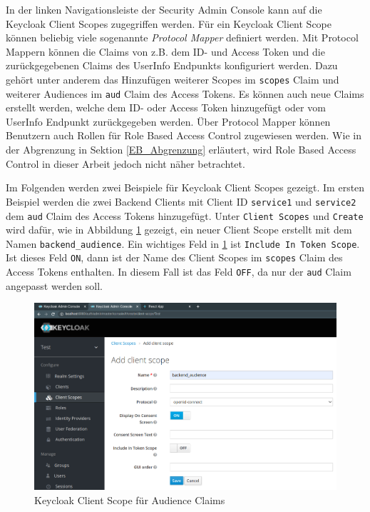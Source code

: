 In der linken Navigationsleiste der Security Admin Console kann auf die Keycloak Client Scopes zugegriffen werden. Für ein Keycloak Client Scope können beliebig viele sogenannte \textit{Protocol Mapper} definiert werden. Mit Protocol Mappern können die Claims von z.B. dem ID- und Access Token und die zurückgegebenen Claims des UserInfo Endpunkts konfiguriert werden. Dazu gehört unter anderem das Hinzufügen weiterer Scopes im \texttt{scopes} Claim und weiterer Audiences im \texttt{aud} Claim des Access Tokens. Es können auch neue Claims erstellt werden, welche dem ID- oder Access Token hinzugefügt oder vom UserInfo Endpunkt zurückgegeben werden. Über Protocol Mapper können Benutzern auch Rollen für Role Based Access Control zugewiesen werden. Wie in der Abgrenzung in Sektion \ref{EB_Abgrenzung} erläutert, wird Role Based Access Control in dieser Arbeit jedoch nicht näher betrachtet. 

Im Folgenden werden zwei Beispiele für Keycloak Client Scopes gezeigt. Im ersten Beispiel werden die zwei Backend Clients mit Client ID \texttt{service1} und \texttt{service2} dem \texttt{aud} Claim des Access Tokens hinzugefügt. Unter \texttt{Client Scopes} und \texttt{Create} wird dafür, wie in Abbildung \ref{fig:EB_Keycloak Client Scope für Audience Claim} gezeigt, ein neuer Client Scope erstellt mit dem Namen \texttt{backend\_audience}. Ein wichtiges Feld in \ref{fig:EB_Keycloak Client Scope für Audience Claim} ist \texttt{Include In Token Scope}. Ist dieses Feld \texttt{ON}, dann ist der Name des Client Scopes im \texttt{scopes} Claim des Access Tokens enthalten. In diesem Fall ist das Feld \texttt{OFF}, da nur der \texttt{aud} Claim angepasst werden soll.

\begin{figure}[!ht]
	\centering
	\includegraphics[width=1\textwidth]{Images/EbertScherer/KeycloakNewAudClientScope.PNG}
	\caption{Keycloak Client Scope für Audience Claims}
	\label{fig:EB_Keycloak Client Scope für Audience Claim}
\end{figure}

